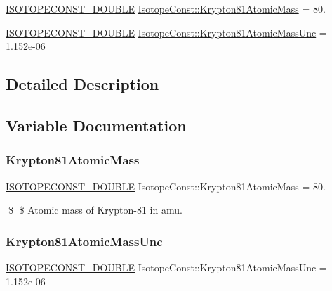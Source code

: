 \begin{DoxyCompactItemize}
\item 
\mbox{\hyperlink{group___isotope_const-_macros_ga8f45a7272ce02c0b4c65c44636ed719a}{I\+S\+O\+T\+O\+P\+E\+C\+O\+N\+S\+T\+\_\+\+D\+O\+U\+B\+LE}} \mbox{\hyperlink{group___isotope_const-_krypton-_kr81_gaa3c2762d3ca0a0644626f583c183402c}{Isotope\+Const\+::\+Krypton81\+Atomic\+Mass}} = 80.
\item 
\mbox{\hyperlink{group___isotope_const-_macros_ga8f45a7272ce02c0b4c65c44636ed719a}{I\+S\+O\+T\+O\+P\+E\+C\+O\+N\+S\+T\+\_\+\+D\+O\+U\+B\+LE}} \mbox{\hyperlink{group___isotope_const-_krypton-_kr81_gab17ef8f4be389313c163e6965821de29}{Isotope\+Const\+::\+Krypton81\+Atomic\+Mass\+Unc}} = 1.\+152e-\/06
\end{DoxyCompactItemize}


\subsection{Detailed Description}


\subsection{Variable Documentation}
\mbox{\label{group___isotope_const-_krypton-_kr81_gaa3c2762d3ca0a0644626f583c183402c}} 
\subsubsection{\texorpdfstring{Krypton81\+Atomic\+Mass}{Krypton81AtomicMass}}
{\footnotesize\ttfamily \mbox{\hyperlink{group___isotope_const-_macros_ga8f45a7272ce02c0b4c65c44636ed719a}{I\+S\+O\+T\+O\+P\+E\+C\+O\+N\+S\+T\+\_\+\+D\+O\+U\+B\+LE}} Isotope\+Const\+::\+Krypton81\+Atomic\+Mass = 80.}

\$ \$ Atomic mass of Krypton-\/81 in amu. \mbox{\label{group___isotope_const-_krypton-_kr81_gab17ef8f4be389313c163e6965821de29}} 
\subsubsection{\texorpdfstring{Krypton81\+Atomic\+Mass\+Unc}{Krypton81AtomicMassUnc}}
{\footnotesize\ttfamily \mbox{\hyperlink{group___isotope_const-_macros_ga8f45a7272ce02c0b4c65c44636ed719a}{I\+S\+O\+T\+O\+P\+E\+C\+O\+N\+S\+T\+\_\+\+D\+O\+U\+B\+LE}} Isotope\+Const\+::\+Krypton81\+Atomic\+Mass\+Unc = 1.\+152e-\/06}

